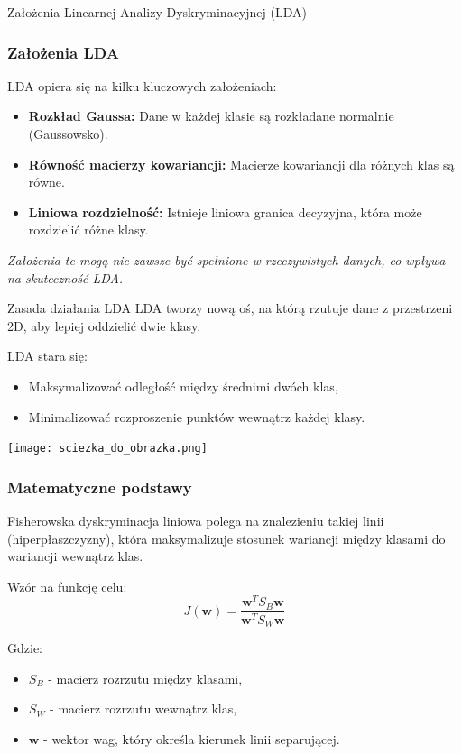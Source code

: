 \documentclass{beamer}
\begin{document}
\begin{frame}{Założenia Linearnej Analizy Dyskryminacyjnej (LDA)}
    \frametitle{Założenia LDA}
    LDA opiera się na kilku kluczowych założeniach:
    \begin{itemize}
        \item \textbf{Rozkład Gaussa:} Dane w każdej klasie są rozkładane normalnie (Gaussowsko).
        \item \textbf{Równość macierzy kowariancji:} Macierze kowariancji dla różnych klas są równe.
        \item \textbf{Liniowa rozdzielność:} Istnieje liniowa granica decyzyjna, która może rozdzielić różne klasy.
    \end{itemize}
    
    \textit{Założenia te mogą nie zawsze być spełnione w rzeczywistych danych, co wpływa na skuteczność LDA.}
\end{frame}






\begin{frame}{Zasada działania LDA}
    LDA tworzy nową oś, na którą rzutuje dane z przestrzeni 2D, aby lepiej oddzielić dwie klasy.

    \bigskip
    LDA stara się:
    \begin{itemize}
        \item Maksymalizować odległość między średnimi dwóch klas,
        \item Minimalizować rozproszenie punktów wewnątrz każdej klasy.
    \end{itemize}
    
    \bigskip
    \texttt{[image: sciezka\_do\_obrazka.png]}  %
\end{frame}











\begin{frame}
    \frametitle{Matematyczne podstawy}
    Fisherowska dyskryminacja liniowa polega na znalezieniu takiej linii (hiperpłaszczyzny), która maksymalizuje stosunek wariancji między klasami do wariancji wewnątrz klas.
    
    Wzór na funkcję celu:
    \[
    J(\mathbf{w}) = \frac{\mathbf{w}^T S_B \mathbf{w}}{\mathbf{w}^T S_W \mathbf{w}}
    \]

    Gdzie:
    \begin{itemize}
        \item \( S_B \) - macierz rozrzutu między klasami,
        \item \( S_W \) - macierz rozrzutu wewnątrz klas,
        \item \( \mathbf{w} \) - wektor wag, który określa kierunek linii separującej.
    \end{itemize}
\end{frame}
\end{document}
